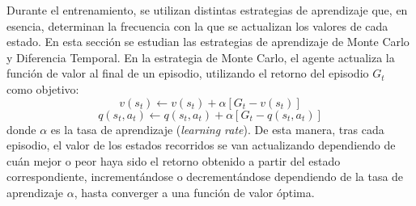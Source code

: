 Durante el entrenamiento, se utilizan distintas estrategias de aprendizaje que, en esencia, determinan la frecuencia con la que se actualizan los valores de cada estado. En esta sección se estudian las estrategias de aprendizaje de Monte Carlo y Diferencia Temporal.
\newpage
En la estrategia de Monte Carlo, el agente actualiza la función de valor al final de un episodio, utilizando el retorno del episodio $G_t$ como objetivo:
\begin{equation}
    v(s_t) \leftarrow v(s_t) + \alpha [G_t - v(s_t)]
    \label{mc-state}
\end{equation}
\begin{equation}
    q(s_t, a_t) \leftarrow q(s_t, a_t) + \alpha [G_t - q(s_t, a_t)]
    \label{mc-action}
\end{equation}
donde $\alpha$ es la tasa de aprendizaje (\emph{learning rate}). De esta manera, tras cada episodio, el valor de los estados recorridos se van actualizando dependiendo de cuán mejor o peor haya sido el retorno obtenido a partir del estado correspondiente, incrementándose o decrementándose dependiendo de la tasa de aprendizaje $\alpha$, hasta converger a una función de valor óptima.



